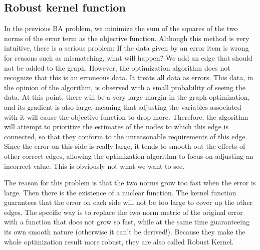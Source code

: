 %
%

\subsection{Robust kernel function}
In the previous BA problem, we minimize the sum of the squares of the two norms of the error term as the objective function. Although this method is very intuitive, there is a serious problem: If the data given by an error item is wrong for reasons such as mismatching, what will happen? We add an edge that should not be added to the graph. However, the optimization algorithm does not recognize that this is an erroneous data. It treats all data as errors. This data, in the opinion of the algorithm, is observed with a small probability of seeing the data. At this point, there will be a very large margin in the graph optimization, and its gradient is also large, meaning that adjusting the variables associated with it will cause the objective function to drop more. Therefore, the algorithm will attempt to prioritize the estimates of the nodes to which this edge is connected, so that they conform to the unreasonable requirements of this edge. Since the error on this side is really large, it tends to smooth out the effects of other correct edges, allowing the optimization algorithm to focus on adjusting an incorrect value. This is obviously not what we want to see.

The reason for this problem is that the two norms grow too fast when the error is large. Then there is the existence of a nuclear function. The kernel function guarantees that the error on each side will not be too large to cover up the other edges. The specific way is to replace the two norm metric of the original error with a function that does not grow so fast, while at the same time guaranteeing its own smooth nature (otherwise it can't be derived!). Because they make the whole optimization result more robust, they are also called Robust Kernel.

